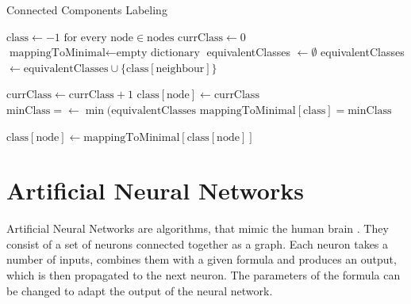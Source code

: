 \begin{algorithm}[h!]
    \caption{Connected Components Labeling}\label{alg:theo:concomp}
    \begin{algorithmic}[1]
            \State $\text{class} \gets -1 \text{ for every node} \in \text{nodes}$
            \State $\text{currClass} \gets 0$
            \State $\text{mappingToMinimal} \gets \text{empty dictionary}$
                \State equivalentClasses $\gets \emptyset$
                        \State equivalentClasses $\gets \text{equivalentClasses} \cup \{\text{class}[\text{neighbour}]\}$
                    \EndIf
                \EndFor

                    \State $\text{currClass} \gets \text{currClass} + 1$
                    \State $\text{class}[\text{node}] \gets \text{currClass}$
                \Else
                    \State $\text{minClass} = \gets \min(\text{equivalentClasses}$
                        \State $\text{mappingToMinimal}[\text{class}] = \text{minClass}$
                    \EndFor
                \EndIf
            \EndFor

                    \State $\text{class}[\text{node}] \gets \text{mappingToMinimal}[\text{class}[\text{node}]]$
                \EndWhile
            \EndFor
        \EndProcedure
    \end{algorithmic}
\end{algorithm}


\section{Artificial Neural Networks}
Artificial Neural Networks are algorithms, that mimic the human brain \cite{Hodgkin1952}. They consist of a set of neurons connected together as a graph. Each neuron takes a number of inputs, combines them with a given formula and produces an output, which is then propagated to the next neuron.
The parameters of the formula can be changed to adapt the output of the neural network.

